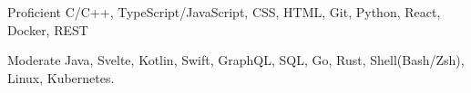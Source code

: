 

\begin{cvskills}

  \cvskill
    {Proficient} %
    {C/C++, TypeScript/JavaScript, CSS, HTML, Git, Python, React, Docker, REST} %

  \cvskill
    {Moderate} %
    {Java, Svelte, Kotlin, Swift, GraphQL, SQL, Go, Rust, Shell(Bash/Zsh), Linux, Kubernetes.} %

\end{cvskills}

